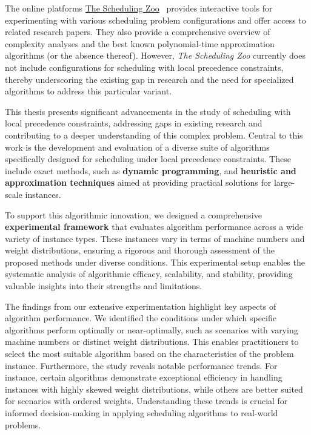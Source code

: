 The online platforms \href{http://schedulingzoo.lip6.fr/}{The Scheduling Zoo}~\cite{SchedulingZoo} provides interactive tools for experimenting with various scheduling problem configurations and offer access to related research papers. They also provide a comprehensive overview of complexity analyses and the best known polynomial-time approximation algorithms (or the absence thereof). However, \textit{The Scheduling Zoo} currently does not include configurations for scheduling with local precedence constraints, thereby underscoring the existing gap in research and the need for specialized algorithms to address this particular variant. \medbreak

This thesis presents significant advancements in the study of scheduling with local precedence constraints, addressing gaps in existing research and contributing to a deeper understanding of this complex problem. Central to this work is the development and evaluation of a diverse suite of algorithms specifically designed for scheduling under local precedence constraints. These include exact methods, such as \textbf{dynamic programming}, and \textbf{heuristic and approximation techniques} aimed at providing practical solutions for large-scale instances.

To support this algorithmic innovation, we designed a comprehensive \textbf{experimental framework} that evaluates algorithm performance across a wide variety of instance types. These instances vary in terms of machine numbers and weight distributions, ensuring a rigorous and thorough assessment of the proposed methods under diverse conditions. This experimental setup enables the systematic analysis of algorithmic efficacy, scalability, and stability, providing valuable insights into their strengths and limitations.

The findings from our extensive experimentation highlight key aspects of algorithm performance. We identified the conditions under which specific algorithms perform optimally or near-optimally, such as scenarios with varying machine numbers or distinct weight distributions. This enables practitioners to select the most suitable algorithm based on the characteristics of the problem instance. Furthermore, the study reveals notable performance trends. For instance, certain algorithms demonstrate exceptional efficiency in handling instances with highly skewed weight distributions, while others are better suited for scenarios with ordered weights. Understanding these trends is crucial for informed decision-making in applying scheduling algorithms to real-world problems.

